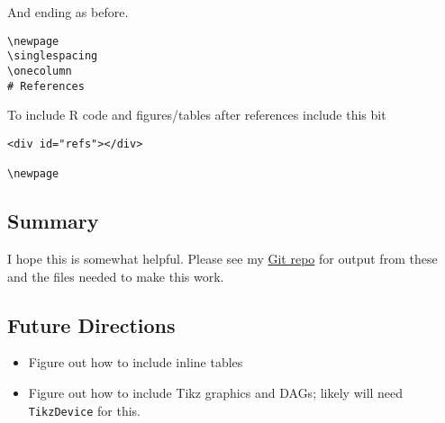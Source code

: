 \documentclass[
]{article}
\providecommand{\tightlist}{%
  \setlength{\itemsep}{0pt}\setlength{\parskip}{0pt}}
\begin{document}
And ending as before.

\begin{verbatim}
\newpage
\singlespacing
\onecolumn
# References
\end{verbatim}

To include R code and figures/tables after references include this bit

\begin{verbatim}
<div id="refs"></div>

\newpage
\end{verbatim}

\hypertarget{summary}{%
\subsection{Summary}\label{summary}}

I hope this is somewhat helpful. Please see my
\href{https://github.com/tpfeeney/academic_paper_in_markdown}{Git repo}
for output from these and the files needed to make this work.

\hypertarget{future-directions}{%
\subsection{Future Directions}\label{future-directions}}

\begin{itemize}
\tightlist
\item
  Figure out how to include inline tables
\item
  Figure out how to include Tikz graphics and DAGs; likely will need
  \texttt{TikzDevice} for this.
\end{itemize}
\end{document}
